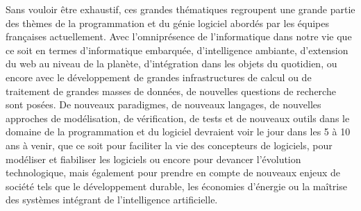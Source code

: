 \documentclass[11pt]{article}
\newcommand{\gpl}[0]{génie de la programmation et du logiciel}
\begin{document}
%

Sans vouloir être exhaustif, ces grandes thématiques regroupent une grande partie des
thèmes de la programmation et du génie logiciel abordés par les équipes
françaises actuellement. 
\noindent
Avec l'omniprésence de l'informatique dans notre vie que ce soit en termes
d'informatique embarquée, d'intelligence ambiante, d'extension du web au niveau
de la planète, d'intégration dans les objets du quotidien, ou encore avec le
développement de grandes infrastructures de calcul ou de traitement de grandes
masses de données, de nouvelles questions de recherche sont posées.
De nouveaux paradigmes, de nouveaux langages, de nouvelles approches de
modélisation, de vérification, de tests et de nouveaux outils dans le domaine
de la programmation et du logiciel devraient voir le jour dans les 5 à 10 ans à
venir, que ce soit pour faciliter la vie des concepteurs de logiciels, pour
modéliser et fiabiliser les logiciels ou encore pour devancer l'évolution
technologique, mais également pour prendre en compte de nouveaux enjeux de
société tels que le développement durable, les économies d'énergie ou la maîtrise des systèmes intégrant de l'intelligence artificielle.
\end{document}
